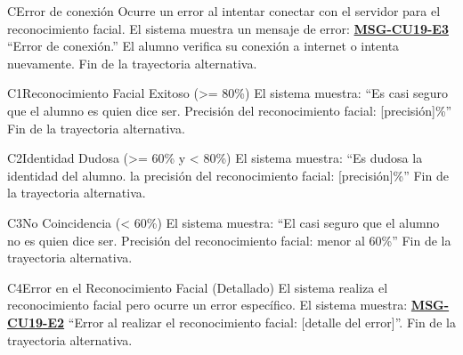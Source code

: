 \begin{UCtrayectoriaA}{C}{Error de conexión}
	\UCpaso Ocurre un error al intentar conectar con el servidor para el reconocimiento facial.
	\UCpaso El sistema muestra un mensaje de error: \textbf{\hyperref[msg:CU19-E3]{MSG-CU19-E3}} ``Error de conexión.''
	\UCpaso[\UCactor] El alumno verifica su conexión a internet o intenta nuevamente.
	\UCpaso Fin de la trayectoria alternativa.
\end{UCtrayectoriaA}
\begin{UCtrayectoriaA}{C1}{Reconocimiento Facial Exitoso (>= 80\%)}
	\UCpaso El sistema muestra: ``Es casi seguro que el alumno es quien dice ser. Precisión del reconocimiento facial: [precisión]\%''
	\UCpaso Fin de la trayectoria alternativa.
\end{UCtrayectoriaA}
\begin{UCtrayectoriaA}{C2}{Identidad Dudosa (>= 60\% y < 80\%)}
	\UCpaso El sistema muestra: ``Es dudosa la identidad del alumno. la precisión del reconocimiento facial: [precisión]\%''
	\UCpaso Fin de la trayectoria alternativa.
\end{UCtrayectoriaA}
\begin{UCtrayectoriaA}{C3}{No Coincidencia (< 60\%)}
	\UCpaso El sistema muestra: ``El casi seguro que el alumno no es quien dice ser. Precisión del reconocimiento facial: menor al 60\%''
	\UCpaso Fin de la trayectoria alternativa.
\end{UCtrayectoriaA}
\begin{UCtrayectoriaA}{C4}{Error en el Reconocimiento Facial (Detallado)}
	\UCpaso El sistema realiza el reconocimiento facial pero ocurre un error específico.
	\UCpaso El sistema muestra: \textbf{\hyperref[msg:CU19-E2]{MSG-CU19-E2}} ``Error al realizar el reconocimiento facial: [detalle del error]''.
	\UCpaso Fin de la trayectoria alternativa.
\end{UCtrayectoriaA}

